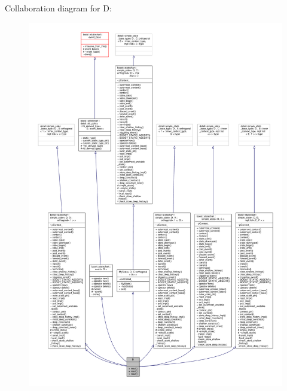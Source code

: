 Collaboration diagram for D\+:
\nopagebreak
\begin{figure}[H]
\begin{center}
\leavevmode
\includegraphics[width=350pt]{struct_d__coll__graph}
\end{center}
\end{figure}
